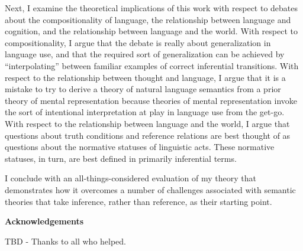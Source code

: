 Next, I examine the theoretical implications of this work with respect to debates about the compositionality of language, the relationship between language and cognition, and the relationship between language and the world. With respect to compositionality, I argue that the debate is really about generalization in language use, and that the required sort of generalization can be achieved by ``interpolating'' between familiar examples of correct inferential transitions. With respect to the relationship between thought and language, I argue that it is a mistake to try to derive a theory of natural language semantics from a prior theory of mental representation because theories of mental representation invoke the sort of intentional interpretation at play in language use from the get-go. With respect to the relationship between language and the world, I argue that questions about truth conditions and reference relations are best thought of as questions about the normative statuses of linguistic acts. These normative statuses, in turn, are best defined in primarily inferential terms. 

I conclude with an all-things-considered evaluation of my theory that demonstrates how it overcomes a number of challenges associated with semantic theories that take inference, rather than reference, as their starting point. 


\cleardoublepage


\begin{center}\textbf{Acknowledgements}\end{center}

TBD - Thanks to all who helped.
\cleardoublepage

\renewcommand\contentsname{Table of Contents}
\tableofcontents
\cleardoublepage
{}    %

\listoftables
\cleardoublepage
{}		%

\listoffigures
\cleardoublepage
{}		%


